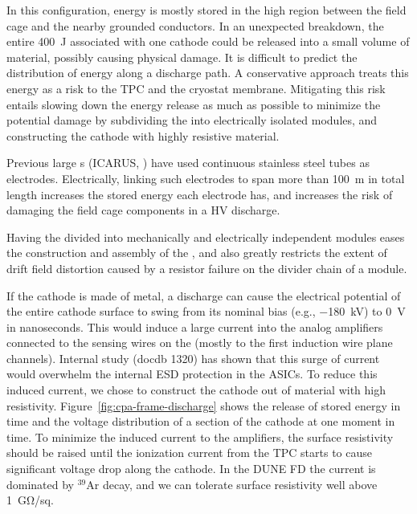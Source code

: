 In this configuration, energy is mostly stored in the high \efield{} region between the field cage and the nearby grounded conductors.  In an unexpected  breakdown, the entire \SI{400}{J} associated with one cathode could be released into a small volume of material, possibly causing physical damage.
It is difficult to predict the distribution of energy along a discharge path. A conservative approach treats this energy as a risk to the TPC and the cryostat membrane.  
Mitigating this risk entails slowing down the energy release as much as possible to minimize the potential damage by subdividing the  into electrically isolated modules, and constructing the cathode with highly resistive material.

Previous large \lartpc{}s (ICARUS, \microboone) have used continuous stainless steel tubes as electrodes. 
Electrically, linking such electrodes to span more than \SI{100}{\m} in total length increases the stored energy each electrode has, and increases the risk of damaging the field cage components in a HV discharge. 

Having the  divided into mechanically and electrically independent modules eases the construction and assembly of the , and also greatly restricts the extent of drift field distortion caused by a resistor failure on the divider chain of a  module.

If the cathode is made of metal, a  discharge can cause the electrical potential of the entire cathode surface to swing from its nominal bias (e.g., \SI{-180}{kV}) to \SI{0}{V} in nanoseconds. This would induce a large current into the analog  amplifiers connected to the sensing wires on the  (mostly to the first induction wire plane channels). Internal study (docdb 1320) has shown that this surge of current would overwhelm the internal ESD protection in the  ASICs.  To reduce this induced current, we chose to construct the cathode out of material with high resistivity.  Figure~\ref{fig:cpa-frame-discharge} shows the release of stored energy in time and the voltage distribution of a section of the cathode at one moment in time.  To minimize the induced current to the amplifiers, the surface resistivity should be raised until the ionization current from the TPC starts to cause significant voltage drop along the cathode.  In the DUNE FD the current is dominated by $^{39}$Ar decay, and we can tolerate surface resistivity well above \SI{1}{\giga\ohm/sq}. 


